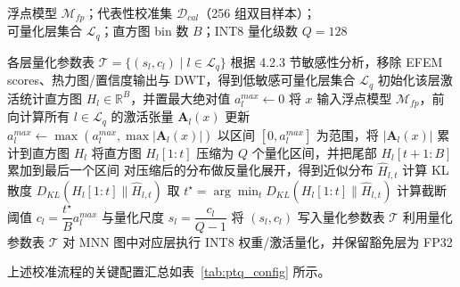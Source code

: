 \begin{algorithm}
  \caption{基于直方图校准的后训练量化算法}
  \label{alg:hist_kl_ptq}
  \renewcommand{\algorithmicrequire}{Input:}
  \renewcommand{\algorithmicensure}{Output:}
  \begin{algorithmic}[1]
    \REQUIRE \parbox[t]{0.82\linewidth}{浮点模型 $\mathcal{M}_{fp}$；代表性校准集 $\mathcal{D}_{cal}$（256 组双目样本）；\\可量化层集合 $\mathcal{L}_q$；直方图 bin 数 $B$；INT8 量化级数 $Q=128$}
    \ENSURE 各层量化参数表 $\mathcal{T}=\{(s_l,c_l)\mid l\in\mathcal{L}_q\}$
    \STATE 根据 4.2.3 节敏感性分析，移除 EFEM scores、热力图/置信度输出与 DWT，得到低敏感可量化层集合 $\mathcal{L}_q$
      \STATE 初始化该层激活统计直方图 $H_l\in\mathbb{R}^{B}$，并置最大绝对值 $a_l^{max}\gets 0$
    \ENDFOR
      \STATE 将 $x$ 输入浮点模型 $\mathcal{M}_{fp}$，前向计算所有 $l\in\mathcal{L}_q$ 的激活张量 $\mathbf{A}_l(x)$
        \STATE 更新 $a_l^{max}\gets \max(a_l^{max}, \max |\mathbf{A}_l(x)|)$
        \STATE 以区间 $[0,a_l^{max}]$ 为范围，将 $|\mathbf{A}_l(x)|$ 累计到直方图 $H_l$
      \ENDFOR
    \ENDFOR
        \STATE 将直方图 $H_l[1:t]$ 压缩为 $Q$ 个量化区间，并把尾部 $H_l[t+1:B]$ 累加到最后一个区间
        \STATE 对压缩后的分布做反量化展开，得到近似分布 $\hat{H}_{l,t}$
        \STATE 计算 KL 散度 $D_{KL}(H_l[1:t]\|\hat{H}_{l,t})$
      \ENDFOR
      \STATE 取 $t^\star=\arg\min_t D_{KL}(H_l[1:t]\|\hat{H}_{l,t})$
      \STATE 计算截断阈值 $c_l=\dfrac{t^\star}{B}a_l^{max}$ 与量化尺度 $s_l=\dfrac{c_l}{Q-1}$
      \STATE 将 $(s_l,c_l)$ 写入量化参数表 $\mathcal{T}$
    \ENDFOR
    \STATE 利用量化参数表 $\mathcal{T}$ 对 MNN 图中对应层执行 INT8 权重/激活量化，并保留豁免层为 FP32
  \end{algorithmic}
\end{algorithm}

上述校准流程的关键配置汇总如表~\ref{tab:ptq_config} 所示。

